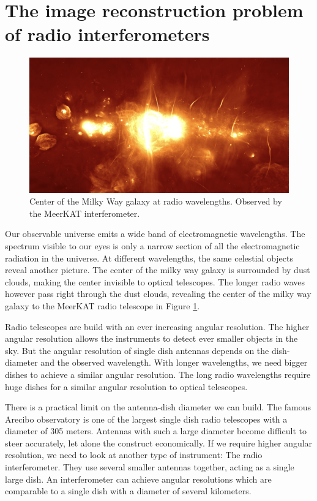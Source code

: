 \section{The image reconstruction problem of radio interferometers}
\begin{figure}[h]
	\includegraphics[width=\linewidth]{./chapters/01.intro/MeerKAT_milkyWay.jpg}
	\caption{Center of the Milky Way galaxy at radio wavelengths. Observed by the MeerKAT interferometer.}
	\label{intro:milky}
\end{figure}

Our observable universe emits a wide band of electromagnetic wavelengths. The spectrum visible to our eyes is only a narrow section of all the electromagnetic radiation in the universe. At different wavelengths, the same celestial objects reveal another picture. The center of the milky way galaxy is surrounded by dust clouds, making the center invisible to optical telescopes. The longer radio waves however pass right through the dust clouds, revealing the center of the milky way galaxy to the MeerKAT radio telescope in Figure \ref{intro:milky}.

Radio telescopes are build with an ever increasing angular resolution. The higher angular resolution allows the instruments to detect ever smaller objects in the sky. But the angular resolution of single dish antennas depends on the dish-diameter and the observed wavelength. With longer wavelengths, we need bigger dishes to achieve a similar angular resolution. The long radio wavelengths require huge dishes for a similar angular resolution to optical telescopes.

There is a practical limit on the antenna-dish diameter we can build. The famous Arecibo observatory is one of the largest single dish radio telescopes with a diameter of 305 meters. Antennas with such a large diameter become difficult to steer accurately, let alone the construct economically. If we require higher angular resolution, we need to look at another type of instrument: The radio interferometer. They use several smaller antennas together, acting as a single large dish. An interferometer can achieve angular resolutions which are comparable to a single dish with a diameter of several kilometers.

